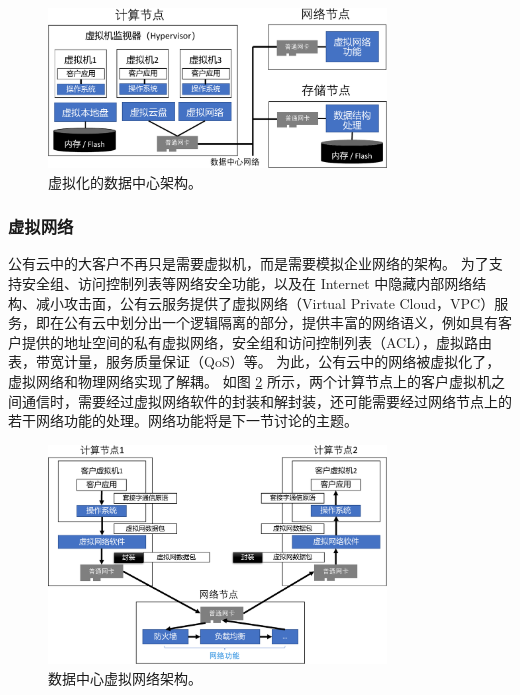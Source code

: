 \begin{figure}[htbp]
	\centering
	\includegraphics[width=0.8\textwidth]{figures/virt_arch.pdf}
	\caption{虚拟化的数据中心架构。}
	\label{background:fig:virt-architecture}
\end{figure}


\subsubsection{虚拟网络}


公有云中的大客户不再只是需要虚拟机，而是需要模拟企业网络的架构。
为了支持安全组、访问控制列表等网络安全功能，以及在 Internet 中隐藏内部网络结构、减小攻击面，公有云服务提供了虚拟网络（Virtual Private Cloud，VPC）服务，即在公有云中划分出一个逻辑隔离的部分，提供丰富的网络语义，例如具有客户提供的地址空间的私有虚拟网络，安全组和访问控制列表（ACL），虚拟路由表，带宽计量，服务质量保证（QoS）等。 
为此，公有云中的网络被虚拟化了，虚拟网络和物理网络实现了解耦。
如图 \ref{background:fig:network-architecture} 所示，两个计算节点上的客户虚拟机之间通信时，需要经过虚拟网络软件的封装和解封装，还可能需要经过网络节点上的若干网络功能的处理。网络功能将是下一节讨论的主题。

\begin{figure}[htbp]
	\centering
	\includegraphics[width=0.8\textwidth]{figures/VPC_arch.pdf}
	\caption{数据中心虚拟网络架构。}
	\label{background:fig:network-architecture}
\end{figure}



